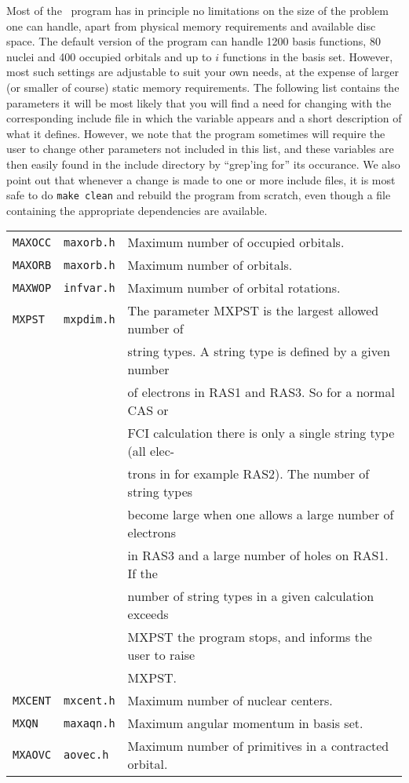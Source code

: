 Most of the \dalton\ program has in principle no limitations on
the size of the problem one can handle, apart from
physical memory requirements and available disc space. The default
version of the program can handle 1200 basis functions, 80 nuclei and
400 occupied orbitals and up to $i$ functions in the basis
set. However, most such settings are adjustable to suit your own
needs, at the expense of larger (or smaller of course) static memory
requirements. The following list contains the parameters it will be
most likely that you will find a need for changing with the
corresponding include 
file in which the variable appears and a short description of what
it defines. However, we note that the program sometimes will
require the user to change other parameters not included in this
list, and these variables are then easily found in the include
directory by ``grep'ing for'' its occurance. We also point out that
whenever a change is made to one or more include files, it is most
safe to do \verb|make clean| and rebuild the program from scratch,
even though a file containing the appropriate dependencies are
available.

\bigskip

\begin{tabular}{lll}
\verb|MAXOCC| & \verb|maxorb.h| & Maximum number of occupied
orbitals.\index{occupied orbitals}\index{limits}\\
\verb|MAXORB| & \verb|maxorb.h| & Maximum number of
orbitals.\index{orbitals}\index{limits}\\
\verb|MAXWOP| & \verb|infvar.h| & Maximum number of orbital
rotations.\index{orbital rotations}\index{limits}\\
\verb|MXPST| & \verb|mxpdim.h| & The parameter MXPST is the largest
allowed number\index{string numbers}\index{limits} of \\ && string types.
A string type is defined by a given number \\&& of electrons in RAS1 and
RAS3. So for a normal CAS or \\ &&  FCI calculation there is only a
single string
type (all elec-\\&&trons in for example RAS2). The number of string types
 \\ & & become large when one allows a large number of electrons
 \\ &&  in  RAS3  and a large number of holes on RAS1. If the
 \\ && number of  string types
in a given calculation exceeds  \\&&  MXPST the program stops, and
informs the user to raise\\&& MXPST.\\
\verb|MXCENT| & \verb|mxcent.h| & Maximum number of nuclear
centers.\index{atomic centers}\index{limits}\\
\verb|MXQN| & \verb|maxaqn.h| & Maximum angular momentum in basis
set.\index{angular momentum}\index{limits}\\
\verb|MXAOVC| & \verb|aovec.h| & Maximum number of primitives in a
contracted orbital.\index{primitive orbitals}\index{limits}
\end{tabular}

